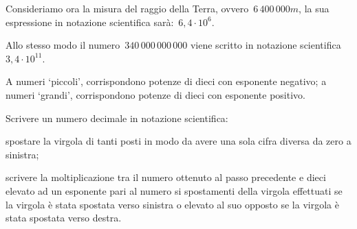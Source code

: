 Consideriamo ora la misura del raggio della Terra, 
ovvero~\(6\,400\,000\unit{m}\),
la sua espressione in notazione scientifica sarà:~\(6,4\cdot10^6\).

Allo stesso modo il numero~\(340\,000\,000\,000\) viene scritto in notazione 
scientifica~\(3,4\cdot10^{11}\).

\begin{osservazione}{}{}
A numeri `piccoli', corrispondono potenze di dieci con 
esponente negativo; 
a numeri `grandi', corrispondono potenze di dieci con esponente positivo.
\end{osservazione}


\begin{procedura}{}{}
Scrivere un numero decimale in notazione scientifica:
\begin{enumeratea} %
 \item spostare la virgola di tanti posti in modo da avere una sola cifra
  diversa da zero a sinistra;
 \item scrivere la moltiplicazione tra il numero ottenuto al passo 
precedente
  e dieci elevato ad un esponente pari al numero si spostamenti della 
virgola 
  effettuati se la virgola è stata spostata verso sinistra o elevato al suo 
  opposto se la virgola è stata spostata verso destra.
\end{enumeratea}
\end{procedura}

